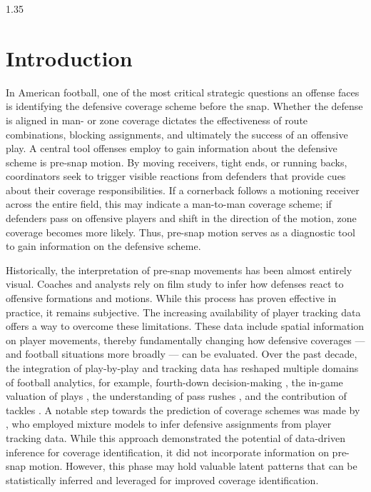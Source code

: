 \documentclass[12pt,a4paper]{article}
\begin{document}
\begin{spacing}{1.35}
\section{Introduction}

In American football, one of the most critical strategic questions an offense faces is identifying the defensive coverage scheme before the snap. Whether the defense is aligned in man- or zone coverage dictates the effectiveness of route combinations, blocking assignments, and ultimately the success of an offensive play. A central tool offenses employ to gain information about the defensive scheme is pre-snap motion. By moving receivers, tight ends, or running backs, coordinators seek to trigger visible reactions from defenders that provide cues about their coverage responsibilities. If a cornerback follows a motioning receiver across the entire field, this may indicate a man-to-man coverage scheme; if defenders pass on offensive players and shift in the direction of the motion, zone coverage becomes more likely. Thus, pre-snap motion serves as a diagnostic tool to gain information on the defensive scheme.

Historically, the interpretation of pre-snap movements has been almost entirely visual. Coaches and analysts rely on film study to infer how defenses react to offensive formations and motions. While this process has proven effective in practice, it remains subjective.
The increasing availability of player tracking data offers a way to overcome these limitations. These data include spatial information on player movements, thereby fundamentally changing how defensive coverages --- and football situations more broadly --- can be evaluated. 
Over the past decade, the integration of play-by-play and tracking data has reshaped multiple domains of football analytics, for example, fourth-down decision-making \citep{sandholtz2024learning, brill2025analytics}, the in-game valuation of plays \citep{yurko}, the understanding of pass rushes \citep{nguyen}, and the contribution of tackles \citep{bajons2025pep}. A notable step towards the prediction of coverage schemes was made by \citet{dutta2020unsupervised}, who employed mixture models to infer defensive assignments from player tracking data. While this approach demonstrated the potential of data-driven inference for coverage identification, it did not incorporate information on pre-snap motion. However, this phase may hold valuable latent patterns that can be statistically inferred and leveraged for improved coverage identification.


\end{spacing}
\end{document}

